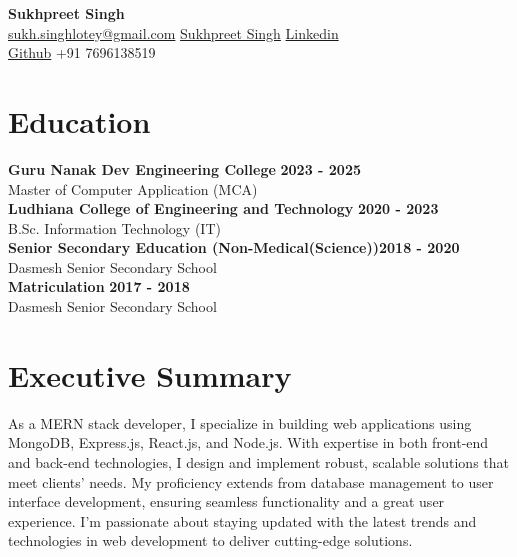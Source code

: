 \documentclass[letterpaper, 11pt]{article}
\newcommand{\iconSpace}{\hspace{1px}}
\newcommand{\hSpace}{\hspace{8px}}
\newcommand{\secStartSpace}{\vspace{3pt}}
\newcommand{\secEndSpace}{\vspace{5pt}}
\newcommand{\spaceCollapse}{\vspace{-5pt}}
\begin{document}
\begin{center} 
	{\Large \textbf{Sukhpreet Singh}}\\
	\vspace{1px}
	{\footnotesize
		 \href{mailto:joesmith@gmail.com}{sukh.singhlotey@gmail.com} 
		\hSpace
		 \iconSpace \href{https://sukhlotey.github.io/imSukhpreet/}{Sukhpreet Singh} 
		\hSpace 
		 \hspace{.1px} \href{https://www.linkedin.com/in/sukhpreetlotey/}{Linkedin} 
		\hSpace
		}\\
	{\footnotesize
		 \iconSpace \href{https://github.com/sukhlotey}{Github}
		\hSpace 
		 \iconSpace
		+91 7696138519
	}
\end{center}
\spaceCollapse


\section{\color{blue} \textbf{Education}}
\secStartSpace

\begin{addmargin}[1em]{1em}
\textbf{Guru Nanak Dev Engineering College} \hfill \textbf{2023 - 2025}\\
        \setlength\parindent{1cm} Master of Computer Application (MCA)\\
	\textbf{Ludhiana College of Engineering and Technology} \hfill \textbf{2020 - 2023}\\
	\setlength\parindent{1cm} B.Sc. Information Technology (IT)\\
        \textbf{Senior Secondary Education (Non-Medical(Science))}\hfill \textbf{2018 - 2020}\\
        \setlength\parindent{1cm} Dasmesh Senior Secondary School\\
        \textbf{  Matriculation }\hfill \textbf{2017 - 2018}\\
        \setlength\parindent{1cm} Dasmesh Senior Secondary School\\
\end{addmargin}
\secEndSpace


\section{\color{blue} \textbf{Executive Summary}}
\secStartSpace
As a MERN stack developer, I specialize in building web applications using MongoDB, Express.js, React.js, and Node.js. With expertise in both front-end and back-end technologies, I design and implement robust, scalable solutions that meet clients' needs. My proficiency extends from database management to user interface development, ensuring seamless functionality and a great user experience. I'm passionate about staying updated with the latest trends and technologies in web development to deliver cutting-edge solutions.
\newline
\secEndSpace
\end{document}
